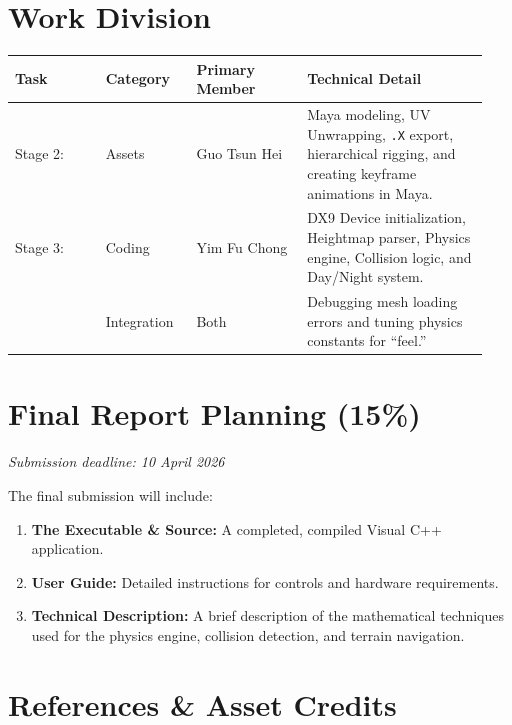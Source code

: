 \documentclass[11pt,a4paper]{article}
\begin{document}
\section{Work Division}

\begin{table}[htbp]
  \centering
  \begin{tabular}{@{}p{0.18\linewidth} p{0.18\linewidth} p{0.22\linewidth} p{0.36\linewidth}@{}}
    \toprule
    \textbf{Task} & \textbf{Category} & \textbf{Primary Member} & \textbf{Technical Detail} \\
    \midrule
    Stage 2: & Assets & Guo Tsun Hei & Maya modeling, UV Unwrapping, \texttt{.X} export, hierarchical rigging, and creating keyframe animations in Maya. \\
    Stage 3: & Coding & Yim Fu Chong & DX9 Device initialization, Heightmap parser, Physics engine, Collision logic, and Day/Night system. \\
    & Integration & Both & Debugging mesh loading errors and tuning physics constants for ``feel.'' \\
    \bottomrule
  \end{tabular}
\end{table}

\section{Final Report Planning (15\%)}

\textit{Submission deadline: 10 April 2026}

The final submission will include:

\begin{enumerate}
  \item \textbf{The Executable \& Source:} A completed, compiled Visual C++ application.
  \item \textbf{User Guide:} Detailed instructions for controls and hardware requirements.
  \item \textbf{Technical Description:} A brief description of the mathematical techniques used for the physics engine, collision detection, and terrain navigation.
\end{enumerate}

\section{References \& Asset Credits}

\begingroup
\sloppy
\setlength{\emergencystretch}{4em}
\end{document}
